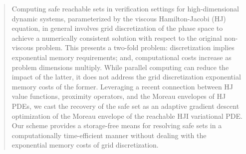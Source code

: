 \begin{abstract}
	Computing safe reachable sets in verification settings for high-dimensional dynamic systems, parameterized by the viscous Hamilton-Jacobi (HJ) equation, in general involves grid discretization of the phase space to achieve a numerically consistent solution with respect to the original  non-viscous problem. This presents a two-fold problem: discretization implies exponential memory requirements; and, computational costs increase as problem dimensions multiply. While parallel computing can reduce the impact of the latter, it does not address the grid discretization exponential memory costs of the former. Leveraging a recent connection between HJ value functions, proximity operators, and the Moreau envelopes of HJ PDEs, we cast the recovery of the safe set as an adaptive gradient descent optimization of the Moreau envelope of the reachable HJI variational PDE. Our scheme provides a storage-free means for resolving safe sets in a computationally time-efficient manner without dealing with the exponential memory costs of grid discretization. %
\end{abstract}